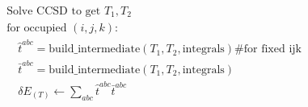 \documentclass{standalone}
\begin{document}
\begin{equation*}
\begin{aligned}
	&\textrm{Solve CCSD to get } T_{1}, T_{2} \\
	&\textrm{for occupied } (i,j,k): \\
	&\quad \hat{t}^{abc} = \text{build\_intermediate}(T_1, T_2, \text{integrals}) \# \textrm{for fixed ijk} \\
	&\quad \bar{t}^{abc} = \text{build\_intermediate}(T_1, T_2, \text{integrals}) \\
	&\quad \delta E_{(T)} \gets \sum_{abc} \hat{t}^{abc} \bar{t}^{abc}
\end{aligned}
\end{equation*}
\end{document}
